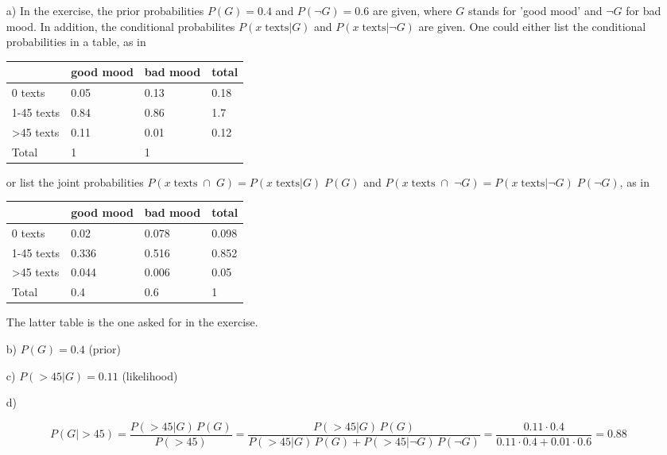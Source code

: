 \documentclass[fontsize=11pt,DIV=18,parskip=half]{scrartcl}
\begin{document}
\begin{enumerate}
\item[a)] In the exercise, the prior probabilities $P(G)=0.4$ and $P(\neg G)=0.6$ are given, where $G$ stands for 'good mood' and $\neg G$ for bad mood. In addition, the conditional probabilites $P(x \; \text{texts}|G)$ and $P(x \; \text{texts}|\neg G)$ are given. One could either list the conditional probabilities in a table, as in

\begin{tabular}{llll}
\hline
& good mood & bad mood & total \\
\hline
0 texts & 0.05 & 0.13 & 0.18 \\
1-45 texts & 0.84 & 0.86 & 1.7 \\
>45 texts & 0.11 & 0.01 & 0.12 \\
Total & 1  & 1 & \\
\hline
\end{tabular}

or list the joint probabilities $P(x \; \text{texts} \; \cap \; G) = P(x \; \text{texts} | G) \; P(G)$ and $P(x \; \text{texts} \; \cap \; \neg G) = P(x \; \text{texts} | \neg G) \; P(\neg G)$, as in

\begin{tabular}{llll}
\hline
& good mood & bad mood & total \\
\hline
0 texts & 0.02 & 0.078 & 0.098 \\
1-45 texts & 0.336 & 0.516 & 0.852 \\
>45 texts & 0.044 & 0.006 & 0.05 \\
Total & 0.4  & 0.6 &  1\\
\hline
\end{tabular}

The latter table is the one asked for in the exercise.

\item[b)] $P(G) = 0.4$ (prior)

\item[c)] $P(>45|G) = 0.11$ (likelihood)

\item[d)]

\begin{equation*}
P(G|>45) = \frac{P(>45|G) \, P(G)}{P(>45)} = \frac{P(>45|G) \, P(G)}{P(>45|G)\,P(G) + P(>45|\neg G)\,P(\neg G)} = \frac{0.11 \cdot 0.4}{0.11 \cdot 0.4 + 0.01 \cdot 0.6} = 0.88
\end{equation*}
\end{enumerate}
\end{document}
